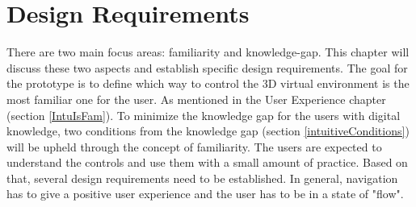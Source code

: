 \section{Design Requirements}\label{DesignRequirements}
There are two main focus areas: familiarity and knowledge-gap. This chapter will discuss these two aspects and establish specific design requirements. 
The goal for the prototype is to define which way to control the 3D virtual environment is the most familiar one for the user. As mentioned in the User Experience chapter (section \ref{IntuIsFam}).
To minimize the knowledge gap for the users with digital knowledge, two conditions from the knowledge gap (section \ref{intuitiveConditions}) will be upheld through the concept of familiarity. The users are expected to understand the controls and use them with a small amount of practice. Based on that, several design requirements need to be established. In general, navigation has to give a positive user experience and the user has to be in a state of "flow". 

